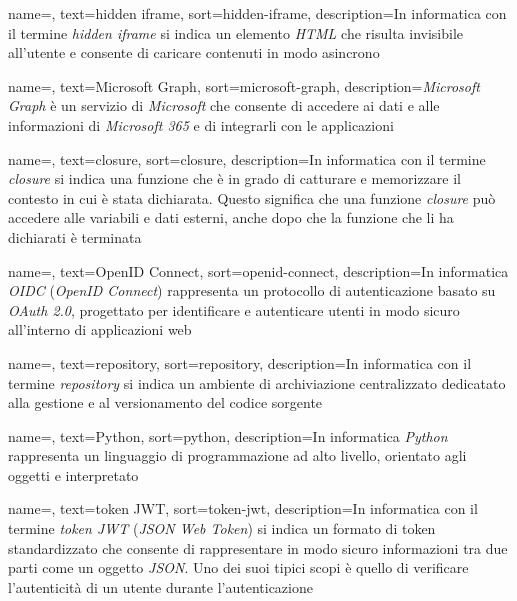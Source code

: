  {
    name=,
    text=hidden iframe,
    sort=hidden-iframe,
    description={In informatica con il termine \emph{hidden iframe} si indica un elemento \emph{HTML} che risulta invisibile all'utente e consente di caricare contenuti in modo asincrono}
}

 {
    name=,
    text=Microsoft Graph,
    sort=microsoft-graph,
    description={\emph{Microsoft Graph} è un servizio di \emph{Microsoft} che consente di accedere ai dati e alle informazioni di \emph{Microsoft 365} e di integrarli con le applicazioni}
}

 {
    name=,
    text=closure,
    sort=closure,
    description={In informatica con il termine \emph{closure} si indica una funzione che è in grado di catturare e memorizzare il contesto in cui è stata dichiarata. Questo significa che una funzione \emph{closure} può accedere alle variabili e dati esterni, anche dopo che la funzione che li ha dichiarati è terminata}
}

 {
    name=,
    text=OpenID Connect,
    sort=openid-connect,
    description={In informatica \emph{OIDC} (\emph{OpenID Connect}) rappresenta un protocollo di autenticazione basato su \emph{OAuth 2.0}, progettato per identificare e autenticare utenti in modo sicuro all'interno di applicazioni web}
}


 {
    name=,
    text=repository,
    sort=repository,
    description={In informatica con il termine \emph{repository} si indica un ambiente di archiviazione centralizzato dedicatato alla gestione e al versionamento del codice sorgente}
}

 {
    name=,
    text=Python,
    sort=python,
    description={In informatica \emph{Python} rappresenta un linguaggio di programmazione ad alto livello, orientato agli oggetti e interpretato}
}


 {
    name=,
    text=token JWT,
    sort=token-jwt,
    description={In informatica con il termine \emph{token JWT} (\emph{JSON Web Token}) si indica un formato di token standardizzato che consente di rappresentare in modo sicuro informazioni tra due parti come un oggetto \emph{JSON}. Uno dei suoi tipici scopi è quello di verificare l'autenticità di un utente durante l'autenticazione} 
}


